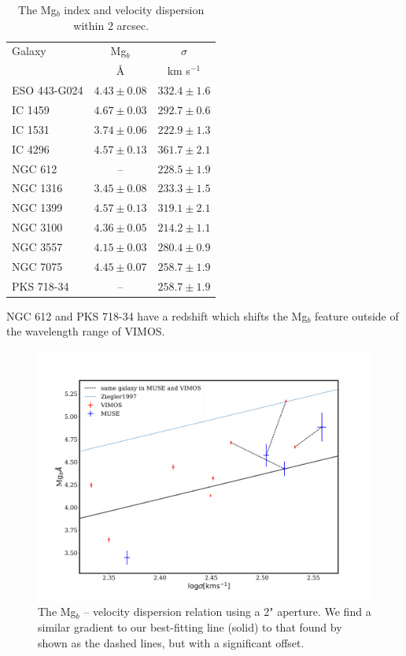 			\begin{table}
				\centering
			\begin{threeparttable}
				\caption{The Mg$_b$ index and velocity dispersion within 2 arcsec.}
				\label{tab:globalMg}
				\begin{tabular}{l c c}
					\hline
					\hline
					Galaxy 	& Mg$_b$ & $\sigma$ \\
							& \AA 	& km s$^{-1}$ \\
					\hline
					ESO 443-G024 & $4.43 \pm 0.08$ & $332.4 \pm 1.6$ \\
					IC 1459 	& $4.67 \pm 0.03$ & $292.7 \pm 0.6$ \\
					IC 1531 	& $3.74 \pm 0.06$ & $222.9 \pm 1.3$ \\
					IC 4296		& $4.57 \pm 0.13$ & $361.7 \pm 2.1$ \\
					NGC 612 	& --   			  & $228.5 \pm 1.9$ \\
					NGC 1316 	& $3.45 \pm 0.08$ & $233.3 \pm 1.5$ \\
					NGC 1399 	& $4.57 \pm 0.13$ & $319.1 \pm 2.1$ \\
					NGC 3100 	& $4.36 \pm 0.05$ & $214.2 \pm 1.1$ \\
					NGC 3557 	& $4.15 \pm 0.03$ & $280.4 \pm 0.9$ \\
					NGC 7075 	& $4.45 \pm 0.07$ & $258.7 \pm 1.9$ \\
					PKS 718-34  & -- 		      & $258.7 \pm 1.9$ \\
					\hline
					\hline
				\end{tabular}
				\begin{tablenotes}
				\footnotesize
				\item NGC 612 and PKS 718-34 have a redshift which shifts the Mg$_b$ feature outside of the wavelength range of VIMOS.
				\end{tablenotes}
			\end{threeparttable}
			\end{table}

			\begin{figure}
				\centering
				\includegraphics[width=.8\textwidth]{chapter4/Mg_sigma.png}
				\caption[Global Mg$_b$--$\sigma$]{The Mg$_b$ -- velocity dispersion relation using a 2" aperture. We find a similar gradient to our best-fitting line (solid) to that found by \citet{Ziegler1997} shown as the dashed lines, but with a significant offset.}
				\label{fig:globalMg}
			\end{figure}

